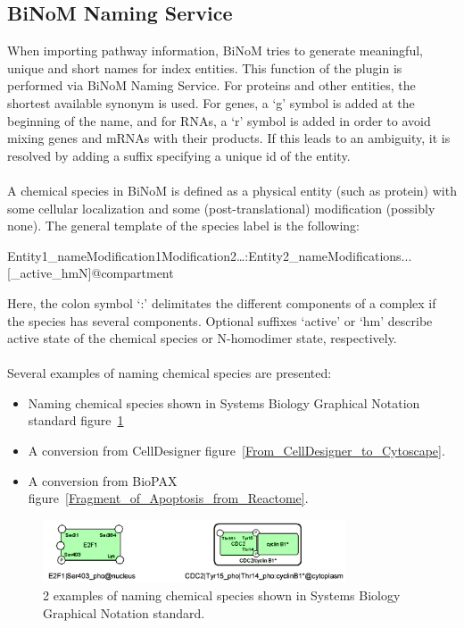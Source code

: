\subsection{BiNoM Naming Service}\label{BiNoM_Naming_Service}
When importing pathway information, BiNoM tries to generate meaningful, unique
and short names for index entities. This function of the plugin is performed via
BiNoM Naming Service. For proteins and other entities, the shortest available
synonym is used. For genes, a ‘g’ symbol is added at the beginning of the name,
and for RNAs, a ‘r’ symbol is added in order to avoid mixing genes and mRNAs
with their products. If this leads to an ambiguity, it is resolved by adding a
suffix specifying a unique id of the entity.\\\\
A chemical species in BiNoM is defined as a physical entity (such as protein)
with some cellular localization and some (post-translational) modification
(possibly none). The general template of the species label is the following:\\
\begin{tiny}
Entity1\_name\textbar Modification1\textbar Modification2\textbar…:Entity2\_name\textbar Modifications...[\_active\textbar \_hmN]@compartment\\
\end{tiny}
Here, the colon symbol ‘:’ delimitates the different components of a complex if
the species has several components. Optional suffixes ‘active’ or ‘hm’ describe
active state of the chemical species or N-homodimer state, respectively.\\\\
Several examples of naming chemical species are presented:
\begin{itemize}
\item Naming chemical species shown in Systems Biology Graphical Notation standard figure~\ref{Names_in_SBGN_standard}
\item A conversion from CellDesigner figure~\ref{From_CellDesigner_to_Cytoscape}.
\item A conversion from BioPAX figure~\ref{Fragment_of_Apoptosis_from_Reactome}.
\end{itemize}
\begin{figure}
\centering
\includegraphics[width=0.8\textwidth]{graphics/Names_in_SBGN_standard}
\caption{2 examples of naming chemical species shown in Systems Biology Graphical Notation standard.}
\label{Names_in_SBGN_standard}
\end{figure}
